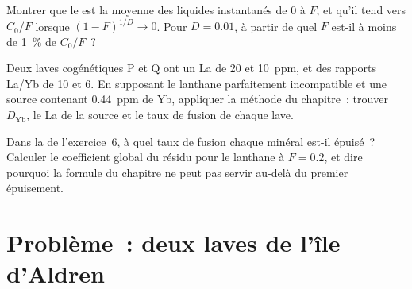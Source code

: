 \begin{exercise}[$\star\star\star$]\label{exo:b3:trace-element-modelling:10}
Montrer que le  est la moyenne des liquides
instantanés de 0 à $F$, et qu'il tend vers $C_0/F$ lorsque $(1 - F)^{1/D} \to 0$.
Pour $D = 0.01$, à partir de quel $F$ est-il à moins de \qty{1}{\percent} de $C_0/F$~?
\end{exercise}

\begin{exercise}[$\star\star\star$]\label{exo:b3:trace-element-modelling:11}
Deux laves cogénétiques P et Q ont un La de 20 et \qty{10}{ppm}, et des rapports La/Yb de 10 et 6.
En supposant le lanthane parfaitement incompatible et une source contenant
\qty{0.44}{ppm} de Yb, appliquer la méthode du chapitre~: trouver $D_{\mathrm{Yb}}$,
le La de la source et le taux de fusion de chaque lave.
\end{exercise}

\begin{exercise}[$\star\star\star$]\label{exo:b3:trace-element-modelling:12}
Dans la  de l'exercice~6, à quel taux de fusion chaque minéral
est-il épuisé~? Calculer le coefficient global du résidu pour le lanthane à
$F = 0.2$, et dire pourquoi la formule du chapitre ne peut pas servir au-delà
du premier épuisement.
\end{exercise}

\section{Problème~: deux laves de l'île d'Aldren}

